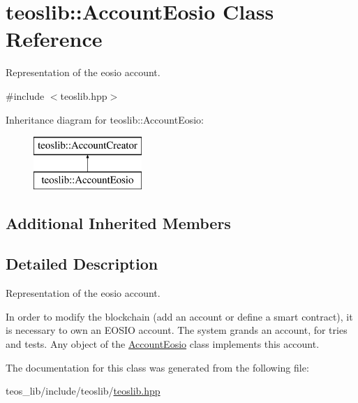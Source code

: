 \hypertarget{classteoslib_1_1_account_eosio}{}\section{teoslib\+:\+:Account\+Eosio Class Reference}
\label{classteoslib_1_1_account_eosio}


Representation of the eosio account.  




{\ttfamily \#include $<$teoslib.\+hpp$>$}

Inheritance diagram for teoslib\+:\+:Account\+Eosio\+:\begin{figure}[H]
\begin{center}
\leavevmode
\includegraphics[height=2.000000cm]{classteoslib_1_1_account_eosio}
\end{center}
\end{figure}
\subsection*{Additional Inherited Members}


\subsection{Detailed Description}
Representation of the eosio account. 

In order to modify the blockchain (add an account or define a smart contract), it is necessary to own an E\+O\+S\+IO account. The system grands an account, for tries and tests. Any object of the \mbox{\hyperlink{classteoslib_1_1_account_eosio}{Account\+Eosio}} class implements this account. 

The documentation for this class was generated from the following file\+:\begin{DoxyCompactItemize}
\item 
teos\+\_\+lib/include/teoslib/\mbox{\hyperlink{teoslib_8hpp}{teoslib.\+hpp}}\end{DoxyCompactItemize}
